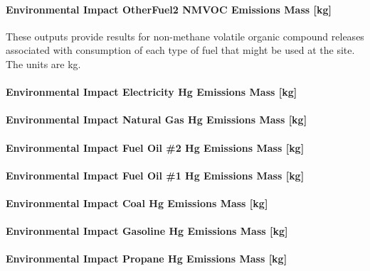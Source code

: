 \paragraph{Environmental Impact OtherFuel2 NMVOC Emissions Mass {[}kg{]}}\label{environmental-impact-otherfuel2-nmvoc-emissions-mass-kg}

These outputs provide results for non-methane volatile organic compound releases associated with consumption of each type of fuel that might be used at the site.~ The units are kg.

\paragraph{Environmental Impact Electricity Hg Emissions Mass {[}kg{]}}\label{environmental-impact-electricity-hg-emissions-mass-kg}

\paragraph{Environmental Impact Natural Gas Hg Emissions Mass {[}kg{]}}\label{environmental-impact-natural-gas-hg-emissions-mass-kg}

\paragraph{Environmental Impact Fuel Oil \#2 Hg Emissions Mass {[}kg{]}}\label{environmental-impact-fuel-oil-2-hg-emissions-mass-kg}

\paragraph{Environmental Impact Fuel Oil \#1 Hg Emissions Mass {[}kg{]}}\label{environmental-impact-fuel-oil-1-hg-emissions-mass-kg}

\paragraph{Environmental Impact Coal Hg Emissions Mass {[}kg{]}}\label{environmental-impact-coal-hg-emissions-mass-kg}

\paragraph{Environmental Impact Gasoline Hg Emissions Mass {[}kg{]}}\label{environmental-impact-gasoline-hg-emissions-mass-kg}

\paragraph{Environmental Impact Propane Hg Emissions Mass {[}kg{]}}\label{environmental-impact-propane-hg-emissions-mass-kg}

